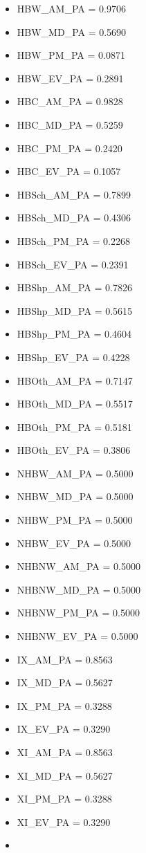 \documentclass[
  letterpaper,
  DIV=11,
  numbers=noendperiod]{scrreprt}
\providecommand{\tightlist}{%
  \setlength{\itemsep}{0pt}\setlength{\parskip}{0pt}}\usepackage{longtable,booktabs,array}
\begin{document}
\begin{itemize}
\tightlist
\item
  HBW\_AM\_PA = 0.9706
\item
  HBW\_MD\_PA = 0.5690
\item
  HBW\_PM\_PA = 0.0871
\item
  HBW\_EV\_PA = 0.2891
\item
  HBC\_AM\_PA = 0.9828
\item
  HBC\_MD\_PA = 0.5259
\item
  HBC\_PM\_PA = 0.2420
\item
  HBC\_EV\_PA = 0.1057
\item
  HBSch\_AM\_PA = 0.7899
\item
  HBSch\_MD\_PA = 0.4306
\item
  HBSch\_PM\_PA = 0.2268
\item
  HBSch\_EV\_PA = 0.2391
\item
  HBShp\_AM\_PA = 0.7826
\item
  HBShp\_MD\_PA = 0.5615
\item
  HBShp\_PM\_PA = 0.4604
\item
  HBShp\_EV\_PA = 0.4228
\item
  HBOth\_AM\_PA = 0.7147
\item
  HBOth\_MD\_PA = 0.5517
\item
  HBOth\_PM\_PA = 0.5181
\item
  HBOth\_EV\_PA = 0.3806
\item
  NHBW\_AM\_PA = 0.5000
\item
  NHBW\_MD\_PA = 0.5000
\item
  NHBW\_PM\_PA = 0.5000
\item
  NHBW\_EV\_PA = 0.5000
\item
  NHBNW\_AM\_PA = 0.5000
\item
  NHBNW\_MD\_PA = 0.5000
\item
  NHBNW\_PM\_PA = 0.5000
\item
  NHBNW\_EV\_PA = 0.5000
\item
  IX\_AM\_PA = 0.8563
\item
  IX\_MD\_PA = 0.5627
\item
  IX\_PM\_PA = 0.3288
\item
  IX\_EV\_PA = 0.3290
\item
  XI\_AM\_PA = 0.8563
\item
  XI\_MD\_PA = 0.5627
\item
  XI\_PM\_PA = 0.3288
\item
  XI\_EV\_PA = 0.3290
\item

\end{itemize}
\end{document}
